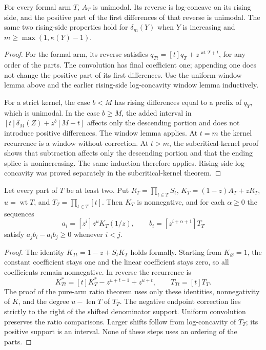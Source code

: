 \begin{proposition}
For every formal arm $T$, $A_T$ is unimodal. Its reverse is
log-concave on its rising side, and the positive part of the
first differences of that reverse is unimodal. The same two
rising-side properties hold for $\delta_m(Y)$ when $Y$ is
increasing and $m\ge\max(1,\kappa(Y)-1)$.
\end{proposition}
\begin{proof}
For the formal arm, its reverse satisfies
$q_{Tt}=[t]q_T+z^{\operatorname{wt}T+t}$, for any order of the
parts. The convolution has final coefficient one; appending one
does not change the positive part of its first differences.
Use the uniform-window lemma above and the earlier rising-side
log-concavity window lemma inductively.

For a strict kernel, the case $b<M$ has rising differences equal
to a prefix of $q_Y$, which is unimodal. In the case $b\ge M$,
the added interval in $[t]\delta_M(Z)+z^b[M-t]$ affects only
the descending portion and does not introduce positive differences.
The window lemma applies. At $t=m$ the kernel recurrence is a
window without correction. At $t>m$, the subcritical-kernel proof
shows that subtraction affects only the descending portion and
that the ending splice is nonincreasing. The same induction
therefore applies. Rising-side log-concavity was proved separately
in the subcritical-kernel theorem.
\end{proof}

\begin{proposition}
Let every part of $T$ be at least two. Put
$R_T=\prod_{t\in T}S_t$, $K_T=(1-z)A_T+zR_T$,
$u=\operatorname{wt}T$, and $T_T=\prod_{t\in T}[t]$.
Then $K_T$ is nonnegative, and for each $\alpha\ge0$ the sequences
\[
 a_i=[z^i]z^uK_T(1/z),\qquad b_i=[z^{i+\alpha+1}]T_T
\]
satisfy $a_jb_i-a_ib_j\ge0$ whenever $i<j$.
\end{proposition}
\begin{proof}
The identity $K_{Tt}=1-z+S_tK_T$ holds formally. Starting from
$K_\varnothing=1$, the constant coefficient stays one and the
linear coefficient stays zero, so all coefficients remain
nonnegative. In reverse the recurrence is
\[
 K_{Tt}^*=[t]K_T^*-z^{u+t-1}+z^{u+t},\qquad
 T_{Tt}=[t]T_T.
\]
The proof of the pure-arm ratio theorem uses only these identities,
nonnegativity of $K$, and the degree $u-\operatorname{len}T$ of
$T_T$. The negative endpoint correction lies strictly to the
right of the shifted denominator support. Uniform convolution
preserves the ratio comparisons. Larger shifts follow from
log-concavity of $T_T$; its positive support is an interval.
None of these steps uses an ordering of the parts.
\end{proof}

